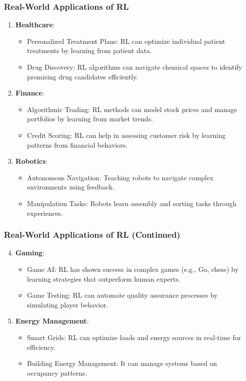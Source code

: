\documentclass[aspectratio=169]{beamer}
\begin{document}
\begin{frame}[fragile]
    \frametitle{Real-World Applications of RL}
    \begin{enumerate}
        \item \textbf{Healthcare}:
        \begin{itemize}
            \item Personalized Treatment Plans: RL can optimize individual patient treatments by learning from patient data.
            \item Drug Discovery: RL algorithms can navigate chemical spaces to identify promising drug candidates efficiently.
        \end{itemize}

        \item \textbf{Finance}:
        \begin{itemize}
            \item Algorithmic Trading: RL methods can model stock prices and manage portfolios by learning from market trends.
            \item Credit Scoring: RL can help in assessing customer risk by learning patterns from financial behaviors.
        \end{itemize}

        \item \textbf{Robotics}:
        \begin{itemize}
            \item Autonomous Navigation: Teaching robots to navigate complex environments using feedback.
            \item Manipulation Tasks: Robots learn assembly and sorting tasks through experiences.
        \end{itemize}
    \end{enumerate}
\end{frame}

\begin{frame}[fragile]
    \frametitle{Real-World Applications of RL (Continued)}
    \begin{enumerate}
        \setcounter{enumi}{3}
        \item \textbf{Gaming}:
        \begin{itemize}
            \item Game AI: RL has shown success in complex games (e.g., Go, chess) by learning strategies that outperform human experts.
            \item Game Testing: RL can automate quality assurance processes by simulating player behavior.
        \end{itemize}

        \item \textbf{Energy Management}:
        \begin{itemize}
            \item Smart Grids: RL can optimize loads and energy sources in real-time for efficiency.
            \item Building Energy Management: It can manage systems based on occupancy patterns.
        \end{itemize}
    \end{enumerate}
\end{frame}
\end{document}
